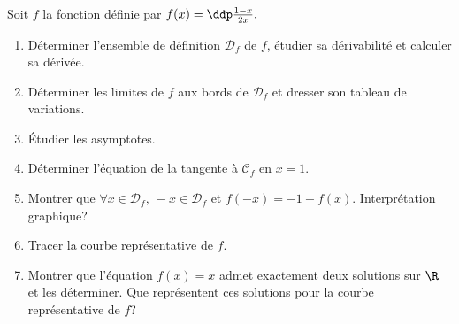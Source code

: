 
\begin{exercice}  \;
Soit $f$ la fonction définie par $f(x)=\ddp\frac{1-x}{2x}.$
\begin{enumerate}
\item Déterminer l'ensemble de définition $\mathcal{D}_f$ de $f$, étudier sa dérivabilité et calculer sa dérivée.
\item Déterminer les limites de $f$ aux bords de $\mathcal{D}_f$ et dresser son tableau de variations.
\item \'Etudier les asymptotes.
\item Déterminer l'équation de la tangente \`{a} $\mathcal{C}_f$ en $x=1$.
\item Montrer que $\forall x\in\mathcal{D}_f,\ -x\in\mathcal{D}_f$ et $f(-x)=-1-f(x)$. Interprétation graphique?
\item Tracer la courbe représentative de $f$.
\item Montrer que l'équation $f(x)=x$ admet exactement deux solutions sur $\R$ et les déterminer.
Que représentent ces solutions pour la courbe représentative de $f$? \end{enumerate}
\end{exercice}